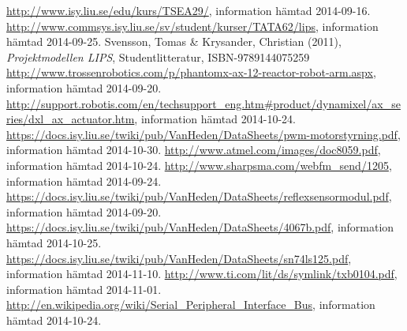 
\begin{thebibliography}{9}
	\url{http://www.isy.liu.se/edu/kurs/TSEA29/}, information hämtad 2014-09-16.
	\url{http://www.commsys.isy.liu.se/sv/student/kurser/TATA62/lips}, information hämtad 2014-09-25.
	Svensson, Tomas \& Krysander, Christian (2011), \textit{Projektmodellen LIPS}, Studentlitteratur, ISBN-9789144075259
	\url{http://www.trossenrobotics.com/p/phantomx-ax-12-reactor-robot-arm.aspx}, information hämtad 2014-09-20.
	\url{http://support.robotis.com/en/techsupport_eng.htm#product/dynamixel/ax_series/dxl_ax_actuator.htm}, information hämtad 	2014-10-24.
	\url{https://docs.isy.liu.se/twiki/pub/VanHeden/DataSheets/pwm-motorstyrning.pdf}, information hämtad 2014-10-30.
	\url{http://www.atmel.com/images/doc8059.pdf}, information hämtad 2014-10-24.
	\url{http://www.sharpsma.com/webfm_send/1205}, information hämtad 2014-09-24.
	\url{https://docs.isy.liu.se/twiki/pub/VanHeden/DataSheets/reflexsensormodul.pdf}, information hämtad 2014-09-20.
	\url{https://docs.isy.liu.se/twiki/pub/VanHeden/DataSheets/4067b.pdf}, information hämtad 2014-10-25.
	\url{https://docs.isy.liu.se/twiki/pub/VanHeden/DataSheets/sn74ls125.pdf}, information hämtad 2014-11-10.
	\url{http://www.ti.com/lit/ds/symlink/txb0104.pdf}, information hämtad 2014-11-01.
	\url{http://en.wikipedia.org/wiki/Serial_Peripheral_Interface_Bus}, information hämtad 2014-10-24.
\end{thebibliography}
